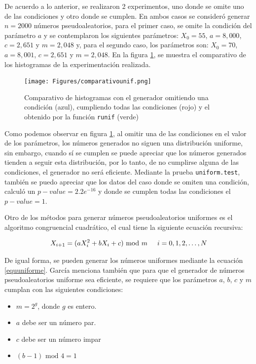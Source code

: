 \documentclass{article}
\begin{document}
De acuerdo a lo anterior, se realizaron 2 experimentos, uno donde se omite uno de las condiciones y otro donde se cumplen. En ambos casos se consideró generar $n=2000$ números pseudoaleatorios, para el primer caso, se omite la condición del parámetro $a$ y se contemplaron los siguientes parámetros: $X_{0}=55$, $a = 8,000$, $c = 2,651$ y $m = 2,048$ y, para el segundo caso, los parámetros son: $X_{0}=70$, $a = 8,001$, $c = 2,651$ y $m = 2,048$. En la figura \ref{pseudouniforme}, se muestra el comparativo de los histogramas de la experimentación realizada.

\begin{figure}
\centering
\texttt{[image: Figures/comparativounif.png]}
\caption{Comparativo de histogramas con el generador omitiendo una condición (azul), cumpliendo todas las condiciones (rojo) y el obtenido por la función \texttt{runif} (verde)}
\label{pseudouniforme}
\end{figure}

Como podemos observar en figura \ref{pseudouniforme}, al omitir una de las condiciones en el valor de los parámetros, los números generados no siguen una distribución uniforme, sin embargo, cuando sí se cumplen se puede apreciar que los números generados tienden a seguir esta distribución, por lo tanto, de no cumplirse alguna de las condiciones, el generador no será eficiente. Mediante la prueba \texttt{uniform.test}, también se puedo apreciar que los datos del caso donde se omiten una condición, calculó un $p-value = 2.2e^{-16}$  y donde se cumplen todas las condiciones el $p-value = 1$.

Otro de los métodos para generar números pseudoaleatorios uniformes es el algoritmo congruencial cuadrático, el cual tiene la siguiente ecuación recursiva:

\begin{equation}
X_ {i+1}= (aX_{i}^{2} + bX_{i} + c) \text{ mod } m \hspace{0,5cm}i=0, 1, 2, \dots, N
\end{equation}

De igual forma, se pueden generar los números uniformes mediante la ecuación \ref{equuniforme}. García \cite{promodel} menciona también que para que el generador de números pseudoaleatorios uniforme sea eficiente, se requiere que los parámetros $a$, $b$, $c$ y $m$ cumplan con las siguientes condiciones:

\begin{itemize}
    \item $m = 2^g$, donde $g$ es entero.
    \item $a$ debe ser un número par.
    \item $c$ debe ser un número impar
    \item $(b-1) \text{ mod } 4 = 1$ 
\end{itemize}
\end{document}
